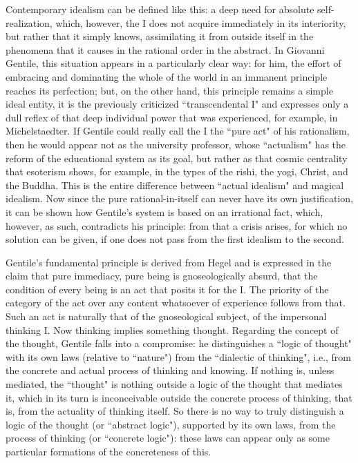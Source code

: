 Contemporary idealism can be defined like this: a deep need for absolute self-realization, which, however, the I does not acquire immediately in its interiority, but rather that it simply knows, assimilating it from outside itself in the phenomena that it causes in the rational order in the abstract. In Giovanni Gentile, this situation appears in a particularly clear way: for him, the effort of embracing and dominating the whole of the world in an immanent principle reaches its perfection; but, on the other hand, this principle remains a simple ideal entity, it is the previously criticized ``transcendental I" and expresses only a dull reflex of that deep individual power that was experienced, for example, in Michelstaedter. If Gentile could really call the I the ``pure act" of his rationalism, then he would appear not as the university professor, whose ``actualism" has the reform of the educational system as its goal, but rather as that cosmic centrality that esoterism shows, for example, in the types of the rishi, the yogi, Christ, and the Buddha. This is the entire difference between ``actual idealism" and magical idealism. Now since the pure rational-in-itself can never have its own justification, it can be shown how Gentile's system is based on an irrational fact, which, however, as such, contradicts his principle: from that a crisis arises, for which no solution can be given, if one does not pass from the first idealism to the second.

Gentile's fundamental principle is derived from Hegel and is expressed in the claim that pure immediacy, pure being is gnoseologically absurd, that the condition of every being is an act that posits it for the I. The priority of the category of the act over any content whatsoever of experience follows from that. Such an act is naturally that of the gnoseological subject, of the impersonal thinking I. Now thinking implies something thought. Regarding the concept of the thought, Gentile falls into a compromise: he distinguishes a ``logic of thought" with its own laws (relative to ``nature") from the ``dialectic of thinking", i.e., from the concrete and actual process of thinking and knowing. If nothing is, unless mediated, the ``thought" is nothing outside a logic of the thought that mediates it, which in its turn is inconceivable outside the concrete process of thinking, that is, from the actuality of thinking itself. So there is no way to truly distinguish a logic of the thought (or ``abstract logic"), supported by its own laws, from the process of thinking (or ``concrete logic"): these laws can appear only as some particular formations of the concreteness of this.

